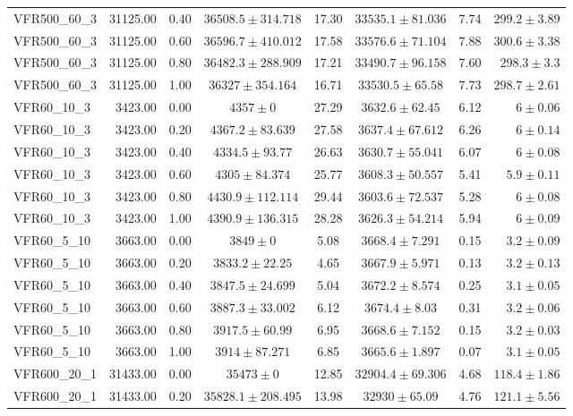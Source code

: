 \begin{longtable}{lrrccccr}
  VFR500\_60\_3 & 31125.00 & 0.40 & $36508.5 \pm 314.718$ & 17.30 & $33535.1 \pm 81.036$ & 7.74 & $299.2 \pm 3.89$ \\ 
  VFR500\_60\_3 & 31125.00 & 0.60 & $36596.7 \pm 410.012$ & 17.58 & $33576.6 \pm 71.104$ & 7.88 & $300.6 \pm 3.38$ \\ 
  VFR500\_60\_3 & 31125.00 & 0.80 & $36482.3 \pm 288.909$ & 17.21 & $33490.7 \pm 96.158$ & 7.60 & $298.3 \pm 3.3$ \\ 
  VFR500\_60\_3 & 31125.00 & 1.00 & $36327 \pm 354.164$ & 16.71 & $33530.5 \pm 65.58$ & 7.73 & $298.7 \pm 2.61$ \\ 
   \midrule
VFR60\_10\_3 & 3423.00 & 0.00 & $4357 \pm 0$ & 27.29 & $3632.6 \pm 62.45$ & 6.12 & $6 \pm 0.06$ \\ 
  VFR60\_10\_3 & 3423.00 & 0.20 & $4367.2 \pm 83.639$ & 27.58 & $3637.4 \pm 67.612$ & 6.26 & $6 \pm 0.14$ \\ 
  VFR60\_10\_3 & 3423.00 & 0.40 & $4334.5 \pm 93.77$ & 26.63 & $3630.7 \pm 55.041$ & 6.07 & $6 \pm 0.08$ \\ 
  VFR60\_10\_3 & 3423.00 & 0.60 & $4305 \pm 84.374$ & 25.77 & $3608.3 \pm 50.557$ & 5.41 & $5.9 \pm 0.11$ \\ 
  VFR60\_10\_3 & 3423.00 & 0.80 & $4430.9 \pm 112.114$ & 29.44 & $3603.6 \pm 72.537$ & 5.28 & $6 \pm 0.08$ \\ 
  VFR60\_10\_3 & 3423.00 & 1.00 & $4390.9 \pm 136.315$ & 28.28 & $3626.3 \pm 54.214$ & 5.94 & $6 \pm 0.09$ \\ 
   \midrule
VFR60\_5\_10 & 3663.00 & 0.00 & $3849 \pm 0$ & 5.08 & $3668.4 \pm 7.291$ & 0.15 & $3.2 \pm 0.09$ \\ 
  VFR60\_5\_10 & 3663.00 & 0.20 & $3833.2 \pm 22.25$ & 4.65 & $3667.9 \pm 5.971$ & 0.13 & $3.2 \pm 0.13$ \\ 
  VFR60\_5\_10 & 3663.00 & 0.40 & $3847.5 \pm 24.699$ & 5.04 & $3672.2 \pm 8.574$ & 0.25 & $3.1 \pm 0.05$ \\ 
  VFR60\_5\_10 & 3663.00 & 0.60 & $3887.3 \pm 33.002$ & 6.12 & $3674.4 \pm 8.03$ & 0.31 & $3.2 \pm 0.06$ \\ 
  VFR60\_5\_10 & 3663.00 & 0.80 & $3917.5 \pm 60.99$ & 6.95 & $3668.6 \pm 7.152$ & 0.15 & $3.2 \pm 0.03$ \\ 
  VFR60\_5\_10 & 3663.00 & 1.00 & $3914 \pm 87.271$ & 6.85 & $3665.6 \pm 1.897$ & 0.07 & $3.1 \pm 0.05$ \\ 
   \midrule
VFR600\_20\_1 & 31433.00 & 0.00 & $35473 \pm 0$ & 12.85 & $32904.4 \pm 69.306$ & 4.68 & $118.4 \pm 1.86$ \\ 
  VFR600\_20\_1 & 31433.00 & 0.20 & $35828.1 \pm 208.495$ & 13.98 & $32930 \pm 65.09$ & 4.76 & $121.1 \pm 5.56$ \\ 

\end{longtable}

